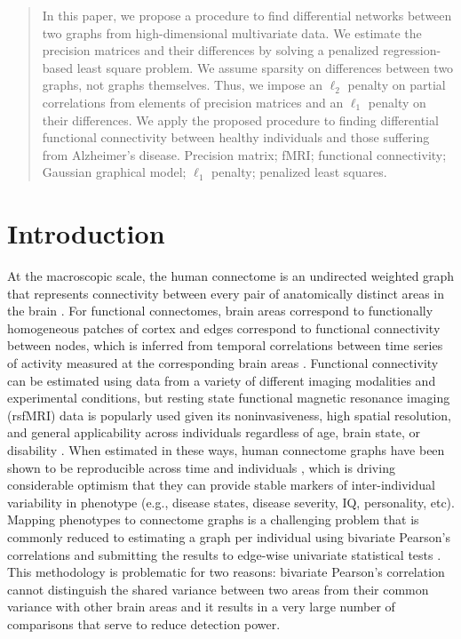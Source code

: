 \documentclass[useAMS,usenatbib,referee]{bio}
\begin{document}
\begin{abstract}
{In this paper, we propose a procedure to find differential networks between two graphs from high-dimensional multivariate data. We estimate the precision matrices and their differences by solving a penalized regression-based least square problem. We assume sparsity on differences between two graphs, not graphs themselves. Thus, we impose an $\ell_2$ penalty on
partial correlations from elements of precision matrices and an $\ell_1$ penalty on their differences. We apply the proposed procedure to finding differential functional connectivity between healthy individuals and those suffering from Alzheimer's disease.}
{ Precision matrix; fMRI; functional connectivity; Gaussian graphical model; $\ell_1$ penalty; penalized least squares.}
\end{abstract}


\section{Introduction}

At the macroscopic scale, the human connectome is an undirected weighted graph that represents connectivity between every pair of anatomically distinct areas in the brain \citep{Craddock2013Connectomes}. For functional connectomes, brain areas correspond to functionally homogeneous patches of cortex and edges correspond to functional connectivity between nodes, which is inferred from temporal correlations between time series of activity measured at the corresponding brain areas \citep{Craddock2013Connectomes,Varoquaux2013}. Functional connectivity can be estimated using data from a variety of different imaging modalities and experimental conditions, but resting state functional magnetic resonance imaging (rsfMRI) data is popularly used given its noninvasiveness, high spatial resolution, and general applicability across individuals regardless of age, brain state, or disability \citep{Biswal1995}. When estimated in these ways, human connectome graphs have been shown to be reproducible across time \citep{shehzad2009} and individuals \citep{damasoix}, which is driving considerable optimism that they can provide stable markers of inter-individual variability in phenotype (e.g., disease states, disease severity, IQ, personality, etc). Mapping phenotypes to connectome graphs is a challenging problem that is commonly reduced to estimating a graph per individual using bivariate Pearson's correlations and submitting the results to edge-wise univariate statistical tests \citep{Craddock2013Connectomes,Varoquaux2013}. This methodology is problematic for two reasons: bivariate Pearson's correlation cannot distinguish the shared variance between two areas from their common variance with other brain areas and it results in a very large number of comparisons that serve to reduce detection power.
\end{document}
